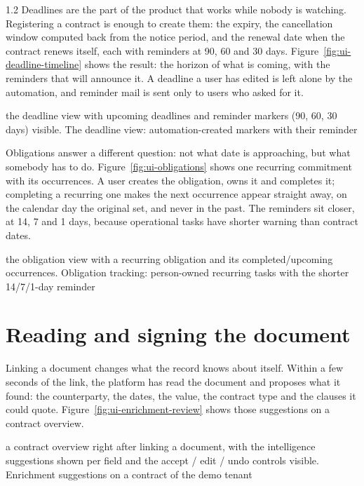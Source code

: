 \begin{spacing}{1.2}
Deadlines are the part of the product that works while nobody is
watching. Registering a contract is enough to create them: the expiry,
the cancellation window computed back from the notice period, and the
renewal date when the contract renews itself, each with reminders at 90,
60 and 30 days. Figure~\ref{fig:ui-deadline-timeline} shows the result:
the horizon of what is coming, with the reminders that will announce it.
A deadline a user has edited is left alone by the automation, and
reminder mail is sent only to users who asked for it.

  {the deadline view with upcoming deadlines and reminder markers (90,
   60, 30 days) visible.}
  {The deadline view: automation-created markers with their reminder}

Obligations answer a different question: not what date is approaching,
but what somebody has to do. Figure~\ref{fig:ui-obligations} shows one
recurring commitment with its occurrences. A user creates the
obligation, owns it and completes it; completing a recurring one makes
the next occurrence appear straight away, on the calendar day the
original set, and never in the past. The reminders sit closer, at 14, 7
and 1 days, because operational tasks have shorter warning than contract
dates.

  {the obligation view with a recurring obligation and its
   completed/upcoming occurrences.}
  {Obligation tracking: person-owned recurring tasks with the shorter
   14/7/1-day reminder}

\section{Reading and signing the document}
\label{sec:walk-intel}

Linking a document changes what the record knows about itself. Within a
few seconds of the link, the platform has read the document and proposes
what it found: the counterparty, the dates, the value, the contract type
and the clauses it could quote.
Figure~\ref{fig:ui-enrichment-review} shows those suggestions on a
contract overview.

  {a contract overview right after linking a document, with the
   intelligence suggestions shown per field and the accept / edit /
   undo controls visible.}
  {Enrichment suggestions on a contract of the demo tenant}


\end{spacing}
